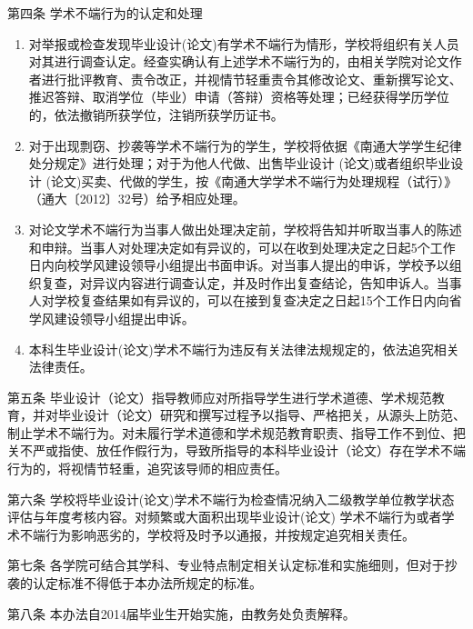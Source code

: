 第四条 \quad 学术不端行为的认定和处理 
\begin{enumerate}
    \item 对举报或检查发现毕业设计(论文)有学术不端行为情形，学校将组织有关人员对其进行调查认定。经查实确认有上述学术不端行为的，由相关学院对论文作者进行批评教育、责令改正，并视情节轻重责令其修改论文、重新撰写论文、推迟答辩、取消学位（毕业）申请（答辩）资格等处理；已经获得学历学位的，依法撤销所获学位，注销所获学历证书。 
    \item 对于出现剽窃、抄袭等学术不端行为的学生，学校将依据《南通大学学生纪律处分规定》进行处理；对于为他人代做、出售毕业设计 (论文)或者组织毕业设计 (论文)买卖、代做的学生，按《南通大学学术不端行为处理规程（试行）》（通大〔2012〕32号）给予相应处理。 
    \item 对论文学术不端行为当事人做出处理决定前，学校将告知并听取当事人的陈述和申辩。当事人对处理决定如有异议的，可以在收到处理决定之日起5个工作日内向校学风建设领导小组提出书面申诉。对当事人提出的申诉，学校予以组织复查，对异议内容进行调查认定，并及时作出复查结论，告知申诉人。当事人对学校复查结果如有异议的，可以在接到复查决定之日起15个工作日内向省学风建设领导小组提出申诉。 
    \item 本科生毕业设计(论文)学术不端行为违反有关法律法规规定的，依法追究相关法律责任。 
\end{enumerate}

第五条 \quad 毕业设计（论文）指导教师应对所指导学生进行学术道德、学术规范教育，并对毕业设计（论文）研究和撰写过程予以指导、严格把关，从源头上防范、制止学术不端行为。对未履行学术道德和学术规范教育职责、指导工作不到位、把关不严或指使、放任作假行为，导致所指导的本科毕业设计（论文）存在学术不端行为的，将视情节轻重，追究该导师的相应责任。 

第六条 \quad 学校将毕业设计(论文)学术不端行为检查情况纳入二级教学单位教学状态评估与年度考核内容。对频繁或大面积出现毕业设计(论文) 学术不端行为或者学术不端行为影响恶劣的，学校将及时予以通报，并按规定追究相关责任。 

第七条 \quad 各学院可结合其学科、专业特点制定相关认定标准和实施细则，但对于抄袭的认定标准不得低于本办法所规定的标准。 

第八条 \quad 本办法自2014届毕业生开始实施，由教务处负责解释。 